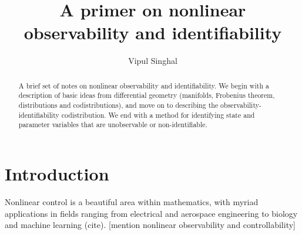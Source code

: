 \documentclass[psamsfonts]{amsart}
\title{A primer on nonlinear observability and identifiability} %
\author{Vipul Singhal}
\theoremstyle{definition}
\theoremstyle{remark}
\numberwithin{equation}{section}
\begin{document}
\begin{abstract}

A brief set of notes on nonlinear observability and identifiability. We begin with a description of basic ideas from differential geometry (manifolds, Frobenius theorem, distributions and codistributions), and move on to describing the observability-identifiability codistribution. We end with a method for identifying state and parameter variables that are unobservable or non-identifiable. %


\end{abstract}

\maketitle
\tableofcontents

\section{Introduction} 
Nonlinear control is a beautiful area within mathematics, with myriad applications in fields ranging from electrical and aerospace engineering to biology and machine learning (cite). [mention nonlinear observability and controllability]
\end{document}
